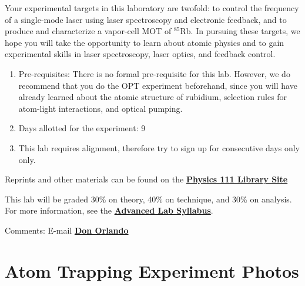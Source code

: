 \documentclass{../lab}
\begin{document}
Your experimental targets in this laboratory are twofold: to control the frequency of a single-mode laser using laser spectroscopy and electronic feedback, and to produce and characterize a vapor-cell MOT of $^{85}$Rb.  In pursuing these targets, we hope you will take the opportunity to learn about atomic physics and to gain experimental skills in laser spectroscopy, laser optics, and feedback control.

\begin{enumerate}
    \item Pre-requisites: There is no formal pre-requisite for this lab. However, we do recommend that you do the OPT experiment beforehand, since you will have already learned about the atomic structure of rubidium, selection rules for atom-light interactions, and optical pumping.

    \item Days allotted for the experiment: 9

    \item This lab requires alignment, therefore try to sign up for consecutive days only only.
\end{enumerate}

Reprints and other materials can be found on the \href{http://physics111.lib.berkeley.edu/Physics111/Reprints/MOT/MOT\_index.html}{\textbf{Physics 111 Library Site}}

This lab will be graded 30\% on theory, 40\% on technique, and 30\% on analysis. For more information, see the \href{http://experimentationlab.berkeley.edu/syllabus}{\textbf{Advanced Lab Syllabus}}.

Comments: E-mail \href{\MailDonOrlando}{\textbf{Don Orlando}}

\section{Atom Trapping Experiment Photos}
\end{document}
